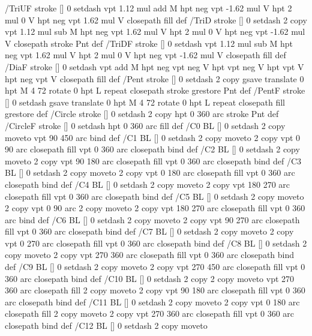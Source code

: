 {/TriUF { stroke [] 0 setdash vpt 1.12 mul add M
  hpt neg vpt -1.62 mul V
  hpt 2 mul 0 V
  hpt neg vpt 1.62 mul V closepath fill } def
/TriD { stroke [] 0 setdash 2 copy vpt 1.12 mul sub M
  hpt neg vpt 1.62 mul V
  hpt 2 mul 0 V
  hpt neg vpt -1.62 mul V closepath stroke
  Pnt  } def
/TriDF { stroke [] 0 setdash vpt 1.12 mul sub M
  hpt neg vpt 1.62 mul V
  hpt 2 mul 0 V
  hpt neg vpt -1.62 mul V closepath fill} def
/DiaF { stroke [] 0 setdash vpt add M
  hpt neg vpt neg V hpt vpt neg V
  hpt vpt V hpt neg vpt V closepath fill } def
/Pent { stroke [] 0 setdash 2 copy gsave
  translate 0 hpt M 4 {72 rotate 0 hpt L} repeat
  closepath stroke grestore Pnt } def
/PentF { stroke [] 0 setdash gsave
  translate 0 hpt M 4 {72 rotate 0 hpt L} repeat
  closepath fill grestore } def
/Circle { stroke [] 0 setdash 2 copy
  hpt 0 360 arc stroke Pnt } def
/CircleF { stroke [] 0 setdash hpt 0 360 arc fill } def
/C0 { BL [] 0 setdash 2 copy moveto vpt 90 450  arc } bind def
/C1 { BL [] 0 setdash 2 copy        moveto
       2 copy  vpt 0 90 arc closepath fill
               vpt 0 360 arc closepath } bind def
/C2 { BL [] 0 setdash 2 copy moveto
       2 copy  vpt 90 180 arc closepath fill
               vpt 0 360 arc closepath } bind def
/C3 { BL [] 0 setdash 2 copy moveto
       2 copy  vpt 0 180 arc closepath fill
               vpt 0 360 arc closepath } bind def
/C4 { BL [] 0 setdash 2 copy moveto
       2 copy  vpt 180 270 arc closepath fill
               vpt 0 360 arc closepath } bind def
/C5 { BL [] 0 setdash 2 copy moveto
       2 copy  vpt 0 90 arc
       2 copy moveto
       2 copy  vpt 180 270 arc closepath fill
               vpt 0 360 arc } bind def
/C6 { BL [] 0 setdash 2 copy moveto
      2 copy  vpt 90 270 arc closepath fill
              vpt 0 360 arc closepath } bind def
/C7 { BL [] 0 setdash 2 copy moveto
      2 copy  vpt 0 270 arc closepath fill
              vpt 0 360 arc closepath } bind def
/C8 { BL [] 0 setdash 2 copy moveto
      2 copy vpt 270 360 arc closepath fill
              vpt 0 360 arc closepath } bind def
/C9 { BL [] 0 setdash 2 copy moveto
      2 copy  vpt 270 450 arc closepath fill
              vpt 0 360 arc closepath } bind def
/C10 { BL [] 0 setdash 2 copy 2 copy moveto vpt 270 360 arc closepath fill
       2 copy moveto
       2 copy vpt 90 180 arc closepath fill
               vpt 0 360 arc closepath } bind def
/C11 { BL [] 0 setdash 2 copy moveto
       2 copy  vpt 0 180 arc closepath fill
       2 copy moveto
       2 copy  vpt 270 360 arc closepath fill
               vpt 0 360 arc closepath } bind def
/C12 { BL [] 0 setdash 2 copy moveto
}}
